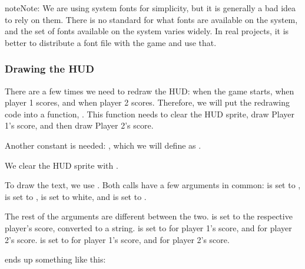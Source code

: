 \documentclass[letterpaper,10pt,english]{sphinxmanual}
\begin{document}
\begin{notice}{note}{Note:}
We are using system fonts for simplicity, but it is generally a bad
idea to rely on them.  There is no standard for what fonts are
available on the system, and the set of fonts available on the system
varies widely.  In real projects, it is better to distribute a font
file with the game and use that.
\end{notice}


\subsubsection{Drawing the HUD}
\label{pong_better:drawing-the-hud}
There are a few times we need to redraw the HUD: when the game starts,
when player 1 scores, and when player 2 scores.  Therefore, we will put
the redrawing code into a function, .  This function
needs to clear the HUD sprite, draw Player 1's score, and then draw
Player 2's score.

Another constant is needed: , which we will define
as .

We clear the HUD sprite with {\hyperref[gfx:sge.gfx.Sprite.draw_clear]{\emph{}}}.

To draw the text, we use {\hyperref[gfx:sge.gfx.Sprite.draw_text]{\emph{}}}.  Both calls
have a few arguments in common:  is set to , 
is set to ,  is set to white, and  is
set to .

The rest of the arguments are different between the two.   is
set to the respective player's score, converted to a string.   is
set to  for player 1's score, and
 for player 2's score.  
is set to  for player 1's score, and  for
player 2's score.

 ends up something like this:
\end{document}
